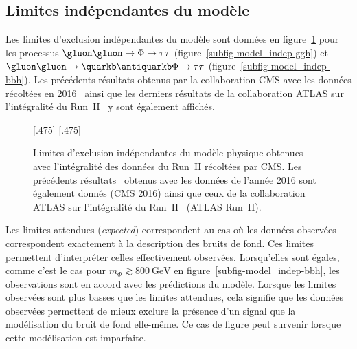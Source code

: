 \subsection{Limites indépendantes du modèle}
Les limites d'exclusion indépendantes du modèle sont données en figure~\ref{fig-model_indep}
pour les processus
$\gluon\gluon\to\Phi\to\tau\tau$ (figure~\ref{subfig-model_indep-ggh})
et
$\gluon\gluon\to\quarkb\antiquarkb\Phi\to\tau\tau$ (figure~\ref{subfig-model_indep-bbh}).
Les précédents résultats obtenus par la collaboration CMS avec les données récoltées en 2016~\cite{CMS-PAS-HIG-17-020}
ainsi que les derniers résultats de la collaboration ATLAS sur l'intégralité du Run~II~\cite{ATLAS-MSSM-HTT_2020} y sont également affichés.
\begin{figure}[h]
\centering

[.475\textwidth]
{}
\hfill
{}[.475\textwidth]
{}


\caption[Limites d'exclusion indépendantes.]{Limites d'exclusion indépendantes du modèle physique obtenues avec l'intégralité des données du Run~II récoltées par CMS. Les précédents résultats~\cite{CMS-PAS-HIG-17-020} obtenus avec les données de l'année 2016 sont également donnés (CMS 2016) ainsi que ceux de la collaboration ATLAS sur l'intégralité du Run~II~\cite{ATLAS-MSSM-HTT_2020} (ATLAS Run~II).}
\label{fig-model_indep}
\end{figure}
\par
Les limites attendues (\emph{expected}) correspondent au cas où
les données observées correspondent exactement à la description des bruits de fond.
Ces limites permettent d'interpréter celles effectivement observées.
Lorsqu'elles sont égales,
comme c'est le cas pour $m_{\Phi}\gtrsim\SI{800}{\GeV}$ en figure~\ref{subfig-model_indep-bbh},
les observations sont en accord avec les prédictions du modèle.
Lorsque les limites observées sont plus basses que les limites attendues,
cela signifie que les données observées permettent de mieux exclure la présence d'un signal
que la modélisation du bruit de fond elle-même.
Ce cas de figure peut survenir lorsque cette modélisation est imparfaite.
